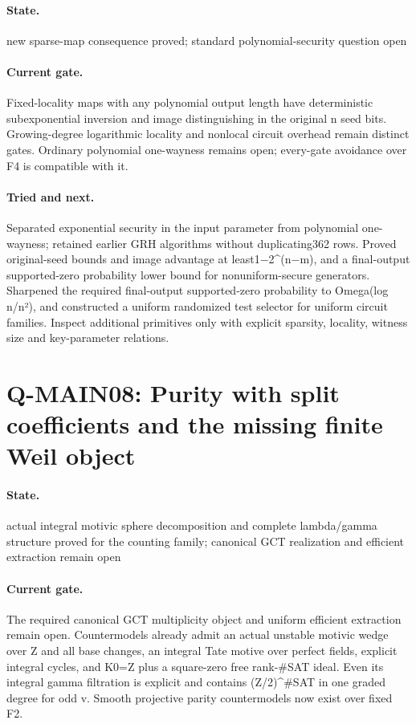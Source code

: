 \paragraph{State.} new sparse-map consequence proved; standard polynomial-security question open
\paragraph{Current gate.} Fixed-locality maps with any polynomial output length have deterministic subexponential inversion and image distinguishing in the original n seed bits. Growing-degree logarithmic locality and nonlocal circuit overhead remain distinct gates. Ordinary polynomial one-wayness remains open; every-gate avoidance over F4 is compatible with it.
\paragraph{Tried and next.} Separated exponential security in the input parameter from polynomial one-wayness; retained earlier GRH algorithms without duplicating362 rows. Proved original-seed bounds and image advantage at least1−2\textasciicircum{}(n−m), and a final-output supported-zero probability lower bound for nonuniform-secure generators. Sharpened the required final-output supported-zero probability to Omega(log n/n²), and constructed a uniform randomized test selector for uniform circuit families. Inspect additional primitives only with explicit sparsity, locality, witness size and key-parameter relations.

\section{Q-MAIN08: Purity with split coefficients and the missing finite Weil object}
\paragraph{State.} actual integral motivic sphere decomposition and complete lambda/gamma structure proved for the counting family; canonical GCT realization and efficient extraction remain open
\paragraph{Current gate.} The required canonical GCT multiplicity object and uniform efficient extraction remain open. Countermodels already admit an actual unstable motivic wedge over Z and all base changes, an integral Tate motive over perfect fields, explicit integral cycles, and K0=Z plus a square-zero free rank-\#SAT ideal. Even its integral gamma filtration is explicit and contains (Z/2)\textasciicircum{}\#SAT in one graded degree for odd v. Smooth projective parity countermodels now exist over fixed F2.

